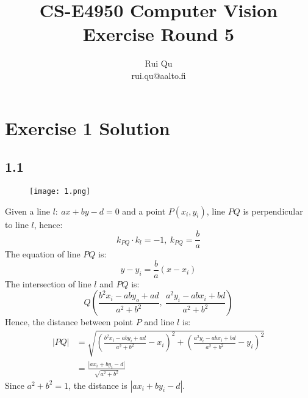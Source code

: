 \documentclass{article}
\begin{document}
\title{CS-E4950 Computer Vision\\Exercise Round 5}                  
\author{Rui Qu\\rui.qu@aalto.fi}
\maketitle



\section*{Exercise 1 Solution}

\subsection*{1.1}
\begin{figure}[H]
\centering  
\texttt{[image: 1.png]}
\label{fig: label}
\end{figure}
Given a line $l:\ ax+by-d=0$ and a point $P(x_i,y_i)$, line $PQ$ is perpendicular to line $l$, hence:
\begin{equation}
k_{PQ}\cdot k_l=-1,\ k_{PQ}=\frac{b}{a}
\end{equation}
The equation of line $PQ$ is:
\begin{equation}
y-y_i=\frac{b}{a}(x-x_i)
\end{equation}
The intersection of line $l$ and $PQ$ is:
\begin{equation}
Q(\frac{b^2x_i-aby_o+ad}{a^2+b^2},\ \frac{a^2y_i-abx_i+bd}{a^2+b^2})
\end{equation}
Hence, the distance between point $P$ and line $l$ is:
\begin{equation}
\begin{aligned}
|PQ|&=\sqrt{(\frac{b^2x_i-aby_i+ad}{a^2+b^2}-x_i)^2+(\frac{a^2y_i-abx_i+bd}{a^2+b^2}-y_i)^2}\\
&=\frac{|ax_i+by_i-d|}{\sqrt{a^2+b^2}}
\end{aligned}
\end{equation}
Since $a^2+b^2=1$, the distance is $|ax_i+by_i-d|$.
 
\end{document}

